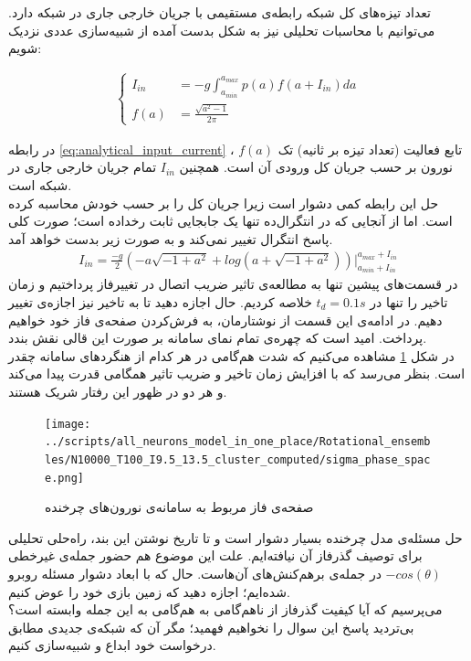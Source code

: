 \documentclass[12pt,onecolumn,a4paper]{article}
\begin{document}
تعداد تیزه‌های کل شبکه رابطه‌ی مستقیمی با جریان خارجی جاری در شبکه دارد. می‌توانیم با محاسبات تحلیلی نیز به شکل بدست آمده از شبیه‌سازی عددی نزدیک شویم:

\begin{align}
\begin{cases}
I_{in} &= -g \int_{a_{min}}^{a_{max}} p(a) f(a + I_{in}) da \\
f(a) &= \frac{\sqrt{a^2 - 1}}{2\pi}
\end{cases}
\label{eq:analytical_input_current}
\end{align}

در رابطه \ref{eq:analytical_input_current} ، $f(a)$ تابع فعالیت (تعداد تیزه بر ثانیه) تک نورون بر حسب جریان کل ورودی آن است. همچنین $I_{in}$ تمام جریان خارجی جاری در شبکه است.\\
حل این رابطه کمی دشوار است زیرا جریان کل را بر حسب خودش محاسبه کرده است. اما از آنجایی که در انتگرال‌ده تنها یک جابجایی ثابت رخداده است؛ صورت کلی پاسخ انتگرال تغییر نمی‌کند و به صورت زیر بدست خواهد آمد.
\begin{align}
I_{in} = \frac{-g}{2} (-a \sqrt{-1 + a^2} + log(a + \sqrt{-1 + a^2})) \Big|_{a_{min} + I_{in}}^{a_{max} + I_{in}}
\end{align}
در قسمت‌های پیشین تنها به مطالعه‌ی تاثیر ضریب اتصال در تغییرفاز پرداختیم و زمان تاخیر را تنها در $t_d = 0.1 s$ خلاصه کردیم. حال اجازه دهید تا به تاخیر نیز اجازه‌ی تغییر دهیم. در ادامه‌ی این قسمت از نوشتارمان، به فرش‌کردن صفحه‌ی فاز خود خواهیم پرداخت. امید است که چهره‌ی تمام نمای سامانه‌ بر صورت این قالی نقش بندد.\\


در شکل \ref{fig:rot_g_d_phase_space} مشاهده می‌کنیم که شدت هم‌گامی در هر کدام از هنگردهای سامانه چقدر است. بنظر می‌رسد که با افزایش زمان تاخیر و ضریب تاثیر همگامی قدرت پیدا می‌کند و هر دو در ظهور این رفتار شریک هستند.
\begin{figure}[h]
\centering
  \texttt{[image: ../scripts/all\_neurons\_model\_in\_one\_place/Rotational\_ensembles/N10000\_T100\_I9.5\_13.5\_cluster\_computed/sigma\_phase\_space.png]}
 \caption{صفحه‌ی فاز مربوط به سامانه‌ی نورون‌های چرخنده}
  \label{fig:rot_g_d_phase_space}
\end{figure}

حل مسئله‌ی مدل چرخنده‌ بسیار دشوار است و تا تاریخ نوشتن این بند، راه‌حلی تحلیلی برای توصیف گذرفاز آن نیافته‌ایم. علت این موضوع هم حضور جمله‌ی غیرخطی $- cos(\theta)$ در جمله‌ی برهم‌کنش‌های آن‌هاست. حال که با ابعاد دشوار مسئله روبرو شده‌ایم؛ اجازه دهید که زمین بازی خود را عوض کنیم.\\
می‌پرسیم که آیا کیفیت گذرفاز از ناهم‌گامی به هم‌گامی به این جمله وابسته است؟ بی‌تردید پاسخ این سوال را نخواهیم فهمید؛ مگر آن که شبکه‌ی جدیدی مطابق درخواست خود ابداع و شبیه‌سازی کنیم.
\end{document}
